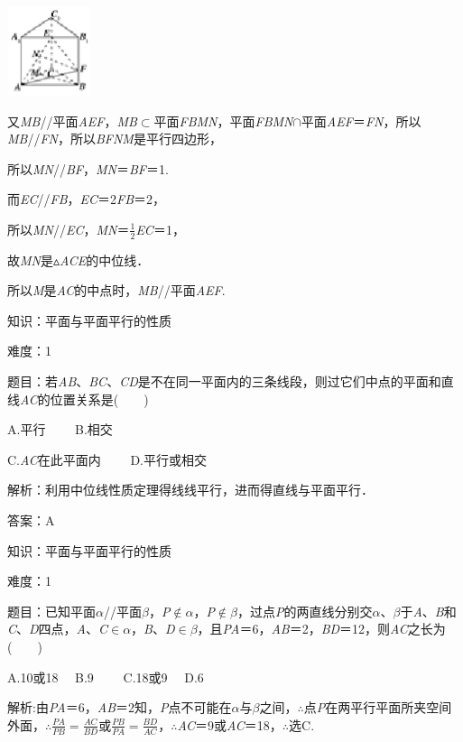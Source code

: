 \documentclass{article} %
\begin{document}
\includegraphics*[width=0.96in, height=1.02in, keepaspectratio=false]{image173}

又\textit{MB}//平面\textit{AEF}，\textit{MB}$\mathrm{\subset }$平面\textit{FBMN}，平面\textit{FBMN}$\mathrm{\cap}$平面\textit{AEF}＝\textit{FN}，所以\textit{MB}//\textit{FN}，所以\textit{BFNM}是平行四边形，

所以\textit{MN}//\textit{BF}，\textit{MN}＝\textit{BF}＝1.

而\textit{EC}//\textit{FB}，\textit{EC}＝2\textit{FB}＝2，

所以\textit{MN}//\textit{EC}，\textit{MN}＝$\frac{1}{2}$\textit{EC}＝1，

故\textit{MN}是$\mathrm{\vartriangle}$\textit{ACE}的中位线．

所以\textit{M}是\textit{AC}的中点时，\textit{MB}//平面\textit{AEF}.


知识：平面与平面平行的性质

难度：1

题目：若\textit{AB}、\textit{BC}、\textit{CD}是不在同一平面内的三条线段，则过它们中点的平面和直线\textit{AC}的位置关系是(　　)

A.平行　　  B.相交

C.\textit{AC}在此平面内　　 D.平行或相交

解析：利用中位线性质定理得线线平行，进而得直线与平面平行．

答案：A

知识：平面与平面平行的性质

难度：1

题目：已知平面\textit{$\alpha$}//平面\textit{$\beta$}，\textit{P}$\mathrm{\notin}$\textit{$\alpha$}，\textit{P}$\mathrm{\notin}$\textit{$\beta$}，过点\textit{P}的两直线分别交\textit{$\alpha$}、\textit{$\beta$}于\textit{A}、\textit{B}和\textit{C}、\textit{D}四点，\textit{A}、\textit{C}$\mathrm{\in}$\textit{$\alpha$}，\textit{B}、\textit{D}$\mathrm{\in}$\textit{$\beta$}，且\textit{PA}＝6，\textit{AB}＝2，\textit{BD}＝12，则\textit{AC}之长为(　　)

A.10或18　 B.9　　 C.18或9　 D.6

解析:由\textit{PA}＝6，\textit{AB}＝2知，\textit{P}点不可能在\textit{$\alpha$}与\textit{$\beta$}之间，$\mathrm{\therefore}$点\textit{P}在两平行平面所夹空间外面，$\mathrm{\therefore}\frac{PA}{PB}=\frac{AC}{BD}$或$\frac{PB}{PA}=\frac{BD}{AC}$，$\mathrm{\therefore}$\textit{AC}＝9或\textit{AC}＝18，$\mathrm{\therefore}$选C.
\end{document}
